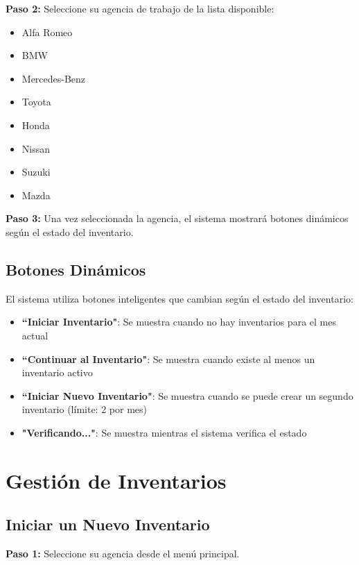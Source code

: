 \documentclass[11pt,a4paper]{article}
\newcommand{\step}[1]{\textbf{\color{primarytext}Paso #1:}}
\begin{document}
\step{2} Seleccione su agencia de trabajo de la lista disponible:
\begin{itemize}
    \item Alfa Romeo
    \item BMW
    \item Mercedes-Benz
    \item Toyota
    \item Honda
    \item Nissan
    \item Suzuki
    \item Mazda
\end{itemize}

\step{3} Una vez seleccionada la agencia, el sistema mostrará botones dinámicos según el estado del inventario.

\subsection{Botones Dinámicos}

El sistema utiliza botones inteligentes que cambian según el estado del inventario:

\begin{successbox}
\begin{itemize}
    \item \textbf{``Iniciar Inventario"}: Se muestra cuando no hay inventarios para el mes actual
    \item \textbf{``Continuar al Inventario"}: Se muestra cuando existe al menos un inventario activo
    \item \textbf{``Iniciar Nuevo Inventario"}: Se muestra cuando se puede crear un segundo inventario (límite: 2 por mes)
    \item \textbf{"Verificando..."}: Se muestra mientras el sistema verifica el estado
\end{itemize}
\end{successbox}

\section{Gestión de Inventarios}

\subsection{Iniciar un Nuevo Inventario}

\step{1} Seleccione su agencia desde el menú principal.
\end{document}
